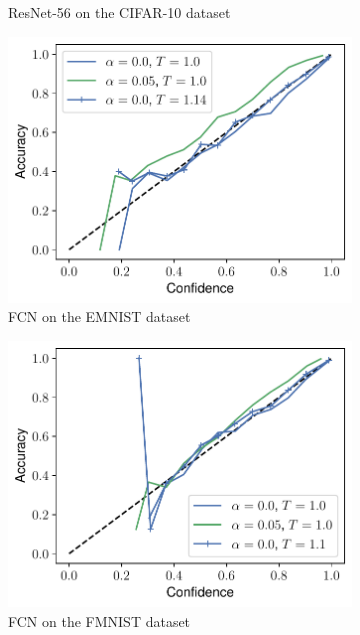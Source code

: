 \begin{figure}[ht]
\begin{subfigure}{.45\textwidth}
    \caption{ResNet-56 on the CIFAR-10 dataset}
\end{subfigure}
\begin{subfigure}{.45\textwidth}
    \centering
    \includegraphics[width=\linewidth]{figures/reliability_emnist.pdf}
    \caption{FCN on the EMNIST dataset}
\end{subfigure}
\hfill
\begin{subfigure}{.45\textwidth}
    \centering
    \includegraphics[width=\linewidth]{figures/reliability_fmnist.pdf}
    \caption{FCN on the FMNIST dataset}
\end{subfigure}
\begin{subfigure}{.45\textwidth}

\end{subfigure}
\end{figure}
